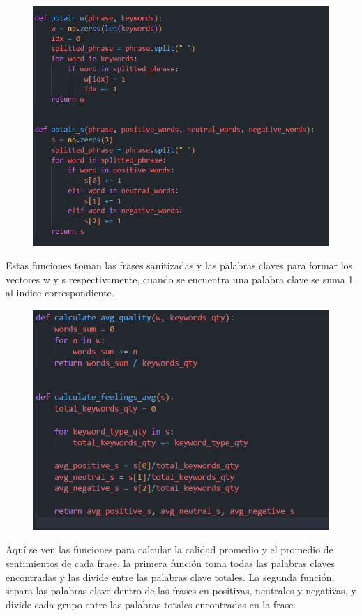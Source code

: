 \documentclass{article}
\begin{document}
    \begin{figure}[H]
        \centering
        \includegraphics[width=1\linewidth]{assets/Codigo2}
    \end{figure}
    Estas funciones toman las frases sanitizadas y las palabras claves para formar los vectores w y s respectivamente, cuando se encuentra una palabra clave se suma 1 al indice correspondiente.\\

    \begin{figure}[H]
        \centering
        \includegraphics[width=1\linewidth]{assets/Codigo3}
    \end{figure}
    Aquí se ven las funciones para calcular la calidad promedio y el promedio de sentimientos de cada frase, la primera función toma todas las palabras claves encontradas y las divide entre las palabras clave totales.
    La segunda función, separa las palabras clave dentro de las frases en positivas, neutrales y negativas, y divide cada grupo entre las palabras totales encontradas en la frase.\\
\end{document}
